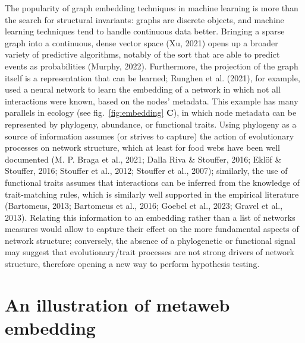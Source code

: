 \documentclass[11pt]{article}
\begin{document}
The popularity of graph embedding techniques in machine learning is more
than the search for structural invariants: graphs are discrete objects,
and machine learning techniques tend to handle continuous data better.
Bringing a sparse graph into a continuous, dense vector space (Xu, 2021)
opens up a broader variety of predictive algorithms, notably of the sort
that are able to predict events as probabilities (Murphy, 2022).
Furthermore, the projection of the graph itself is a representation that
can be learned; Runghen et al. (2021), for example, used a neural
network to learn the embedding of a network in which not all
interactions were known, based on the nodes' metadata. This example has
many parallels in ecology (see fig.~\ref{fig:embedding} \textbf{C}), in
which node metadata can be represented by phylogeny, abundance, or
functional traits. Using phylogeny as a source of information assumes
(or strives to capture) the action of evolutionary processes on network
structure, which at least for food webs have been well documented (M. P.
Braga et al., 2021; Dalla Riva \& Stouffer, 2016; Eklöf \& Stouffer,
2016; Stouffer et al., 2012; Stouffer et al., 2007); similarly, the use
of functional traits assumes that interactions can be inferred from the
knowledge of trait-matching rules, which is similarly well supported in
the empirical literature (Bartomeus, 2013; Bartomeus et al., 2016;
Goebel et al., 2023; Gravel et al., 2013). Relating this information to
an embedding rather than a list of networks measures would allow to
capture their effect on the more fundamental aspects of network
structure; conversely, the absence of a phylogenetic or functional
signal may suggest that evolutionary/trait processes are not strong
drivers of network structure, therefore opening a new way to perform
hypothesis testing.

\hypertarget{an-illustration-of-metaweb-embedding}{%
\section{An illustration of metaweb
embedding}\label{an-illustration-of-metaweb-embedding}}
\end{document}
